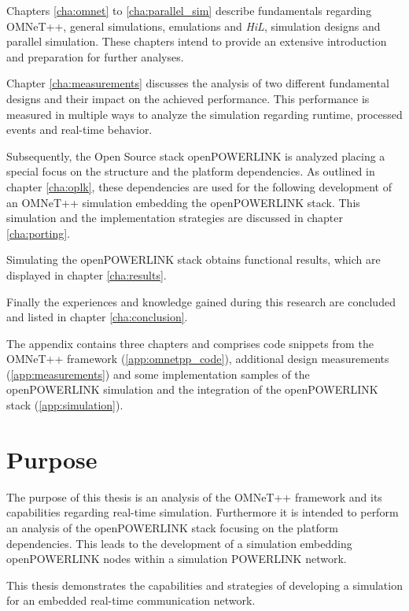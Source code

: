 Chapters \ref{cha:omnet} to \ref{cha:parallel_sim} describe fundamentals regarding OMNeT++, general simulations, emulations and \emph{HiL}, simulation designs and parallel simulation.
These chapters intend to provide an extensive introduction and preparation for further analyses.

Chapter \ref{cha:measurements} discusses the analysis of two different fundamental designs and their impact on the achieved performance.
This performance is measured in multiple ways to analyze the simulation regarding runtime, processed events and real-time behavior.

Subsequently, the Open Source stack openPOWERLINK is analyzed placing a special focus on the structure and the platform dependencies.
As outlined in chapter \ref{cha:oplk}, these dependencies are used for the following development of an OMNeT++ simulation embedding the openPOWERLINK stack.
This simulation and the implementation strategies are discussed in chapter \ref{cha:porting}.

Simulating the openPOWERLINK stack obtains functional results, which are displayed in chapter \ref{cha:results}.

Finally the experiences and knowledge gained during this research are concluded and listed in chapter \ref{cha:conclusion}.

The appendix contains three chapters and comprises code snippets from the OMNeT++ framework (\ref{app:omnetpp_code}), additional design measurements (\ref{app:measurements}) and some implementation samples of the openPOWERLINK simulation and the integration of the openPOWERLINK stack (\ref{app:simulation}).

\section{Purpose}
The purpose of this thesis is an analysis of the OMNeT++ framework and its capabilities regarding real-time simulation.
Furthermore it is intended to perform an analysis of the openPOWERLINK stack focusing on the platform dependencies.
This leads to the development of a simulation embedding openPOWERLINK nodes within a simulation POWERLINK network.

This thesis demonstrates the capabilities and strategies of developing a simulation for an embedded real-time communication network.